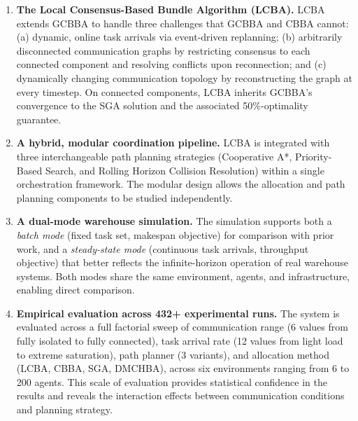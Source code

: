 \begin{enumerate}
  \item \textbf{The Local Consensus-Based Bundle Algorithm (LCBA).}
        LCBA extends GCBBA to handle three challenges that GCBBA and CBBA
        cannot:
        (a) dynamic, online task arrivals via event-driven replanning;
        (b) arbitrarily disconnected communication graphs by restricting
            consensus to each connected component and resolving conflicts
            upon reconnection; and
        (c) dynamically changing communication topology by reconstructing
            the graph at every timestep.
        On connected components, LCBA inherits GCBBA's convergence to the SGA
        solution and the associated 50\%-optimality guarantee.

  \item \textbf{A hybrid, modular coordination pipeline.}
        LCBA is integrated with three interchangeable path planning strategies
        (Cooperative A*, Priority-Based Search, and Rolling Horizon Collision
        Resolution) within a single orchestration framework.
        The modular design allows the allocation and path planning components
        to be studied independently.

  \item \textbf{A dual-mode warehouse simulation.}
        The simulation supports both a \emph{batch mode} (fixed task set,
        makespan objective) for comparison with prior work, and a
        \emph{steady-state mode} (continuous task arrivals, throughput
        objective) that better reflects the infinite-horizon operation of
        real warehouse systems.
        Both modes share the same environment, agents, and infrastructure,
        enabling direct comparison.

  \item \textbf{Empirical evaluation across 432+ experimental runs.}
        The system is evaluated across a full factorial sweep of communication
        range (6 values from fully isolated to fully connected),
        task arrival rate (12 values from light load to extreme saturation),
        path planner (3 variants), and allocation method (LCBA, CBBA, SGA, DMCHBA),
        across six environments ranging from 6 to 200 agents.
        This scale of evaluation provides statistical confidence in the results
        and reveals the interaction effects between communication conditions
        and planning strategy.


\end{enumerate}
